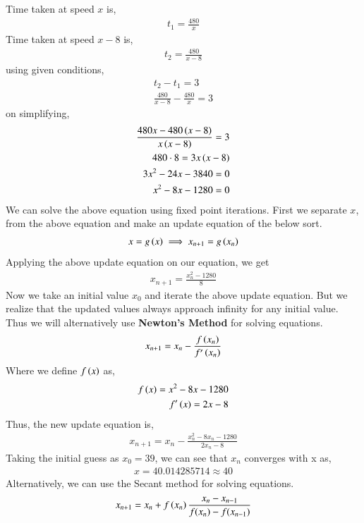 \documentclass[journal]{IEEEtran}
\begin{document}
Time taken at speed $x$ is,
\begin{align}
    t_1 = \frac{480}{x}
\end{align}
Time taken at speed $x-8$ is,
\begin{align}
    t_2 = \frac{480}{x-8}
\end{align}
using given conditions,
\begin{align}
    t_2 - t_1 = 3\\
    \frac{480}{x-8} - \frac{480}{x} = 3
\end{align}
on simplifying,
\begin{align}
    \frac{480x - 480\left(x-8\right)}{x\left(x-8\right)} = 3\\
    480 \cdot 8 = 3x\left(x-8\right)\\
    3x^2 -24x -3840 = 0\\
    x^2 - 8x -1280 = 0
\end{align}
We can solve the above equation using fixed point iterations. First we separate $x$, from the above equation and make an update equation of the below sort.
\begin{align}
	x = g\left(x\right) \implies x_{n+1} = g\left(x_n\right)
\end{align}
Applying the above update equation on our equation, we get
\begin{align}
	x_{n+1} = 	\frac{x_n^2 - 1280}{8}
\end{align}
Now we take an initial value $x_0$ and iterate the above update equation. But we realize that the updated values always approach infinity for any initial value. \\
Thus we will alternatively use \textbf{Newton's Method} for solving equations.
\begin{align}
	x_{n+1} = x_n - \frac{f\left(x_n\right)}{f^{\prime}\left(x_n\right)} 
\end{align}
Where we define $f\left(x\right)$ as, 
\begin{align}
	f\left(x\right) = x^2-8x-1280 \\
	f^{\prime}\left(x\right) = 2x-8 
\end{align}
Thus, the new update equation is, 
\begin{align}
	x_{n+1} = x_n - \frac{x_n^2-8x_n-1280}{2x_n-8 } 
\end{align}
Taking the initial guess as $x_0 = 39$, we can see that $x_n$ converges with x as,
\begin{align}
	x = 40.014285714 \approx 40
\end{align}
Alternatively, we can use the Secant method for solving equations.
\begin{align}
	x_{n+1} = x_n + f\left(x_n\right)\frac{x_{n} -  x_{n-1}}{f(x_{n}) -  f(x_{n-1})}
\end{align}
\end{document}
